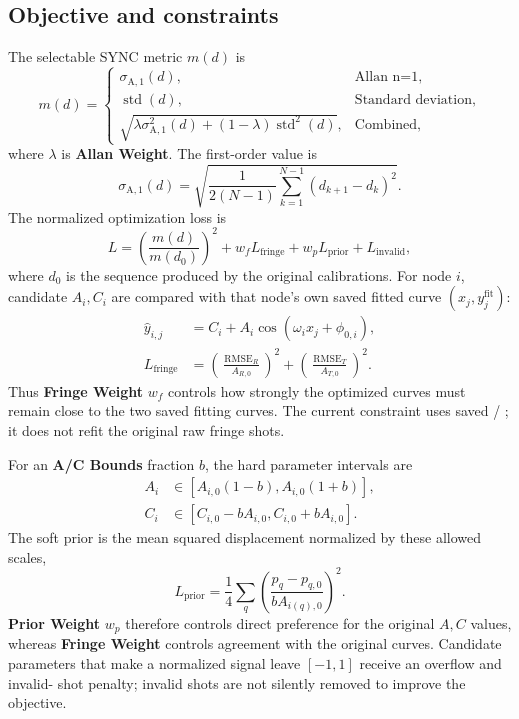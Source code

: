 \documentclass[11pt,oneside,openany]{book}
\newcommand{\code}[1]{\texttt{\detokenize{#1}}}
\newcommand{\ui}[1]{\textbf{#1}}
\begin{document}
\subsection{Objective and constraints}
The selectable SYNC metric $m(d)$ is
\begin{equation}
  m(d)=\begin{cases}
    \sigma_{\mathrm{A},1}(d),&\text{Allan n=1},\\
    \operatorname{std}(d),&\text{Standard deviation},\\
    \sqrt{\lambda\sigma_{\mathrm{A},1}^2(d)+(1-\lambda)\operatorname{std}^2(d)},
      &\text{Combined},
  \end{cases}
\end{equation}
where $\lambda$ is \ui{Allan Weight}. The first-order value is
\begin{equation}
  \sigma_{\mathrm{A},1}(d)
  =\sqrt{\frac{1}{2(N-1)}\sum_{k=1}^{N-1}(d_{k+1}-d_k)^2}.
\end{equation}
The normalized optimization loss is
\begin{equation}
  L=\left(\frac{m(d)}{m(d_0)}\right)^2
  +w_fL_{\mathrm{fringe}}+w_pL_{\mathrm{prior}}+L_{\mathrm{invalid}},
  \label{eq:sync-ac-loss}
\end{equation}
where $d_0$ is the sequence produced by the original calibrations. For node $i$, candidate
$A_i,C_i$ are compared with that node's own saved fitted curve $(x_j,y_j^{\mathrm{fit}})$:
\begin{align}
  \widehat y_{i,j}&=C_i+A_i\cos(\omega_ix_j+\phi_{0,i}),\\
  L_{\mathrm{fringe}}&=
  \left(\frac{\operatorname{RMSE}_R}{A_{R,0}}\right)^2+
  \left(\frac{\operatorname{RMSE}_T}{A_{T,0}}\right)^2.
\end{align}
Thus \ui{Fringe Weight} $w_f$ controls how strongly the optimized curves must remain close
to the two saved fitting curves. The current constraint uses saved \code{fit_x}/
\code{fit_y}; it does not refit the original raw fringe shots.

For an \ui{A/C Bounds} fraction $b$, the hard parameter intervals are
\begin{align}
  A_i&\in[A_{i,0}(1-b),A_{i,0}(1+b)],\\
  C_i&\in[C_{i,0}-bA_{i,0},C_{i,0}+bA_{i,0}].
\end{align}
The soft prior is the mean squared displacement normalized by these allowed scales,
\begin{equation}
  L_{\mathrm{prior}}=\frac{1}{4}\sum_q
  \left(\frac{p_q-p_{q,0}}{bA_{i(q),0}}\right)^2.
\end{equation}
\ui{Prior Weight} $w_p$ therefore controls direct preference for the original $A,C$
values, whereas \ui{Fringe Weight} controls agreement with the original curves. Candidate
parameters that make a normalized signal leave $[-1,1]$ receive an overflow and invalid-
shot penalty; invalid shots are not silently removed to improve the objective.
\end{document}
